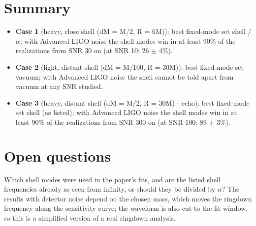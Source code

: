 \documentclass[11pt,a4paper]{article}
\begin{document}
\section{Summary}
\begin{itemize}
\item \textbf{Case 1} (heavy, close shell (dM = M/2, R = 6M)): best fixed-mode set shell / $\alpha$; with Advanced LIGO noise the shell modes win in at least 90\% of the realizations from SNR 30 on (at SNR 10: 26 $\pm$ 4\%).
\item \textbf{Case 2} (light, distant shell (dM = M/100, R = 30M)): best fixed-mode set vacuum; with Advanced LIGO noise the shell cannot be told apart from vacuum at any SNR studied.
\item \textbf{Case 3} (heavy, distant shell (dM = M/2, R = 30M) - echo): best fixed-mode set shell (as listed); with Advanced LIGO noise the shell modes win in at least 90\% of the realizations from SNR 300 on (at SNR 100: 89 $\pm$ 3\%).
\end{itemize}

\section{Open questions}
Which shell modes were used in the paper's fits, and are the listed shell frequencies already as seen from
infinity, or should they be divided by $\alpha$? The results with detector noise depend on the chosen mass,
which moves the ringdown frequency along the sensitivity curve; the waveform is also cut to the fit window,
so this is a simplified version of a real ringdown analysis.
\end{document}
